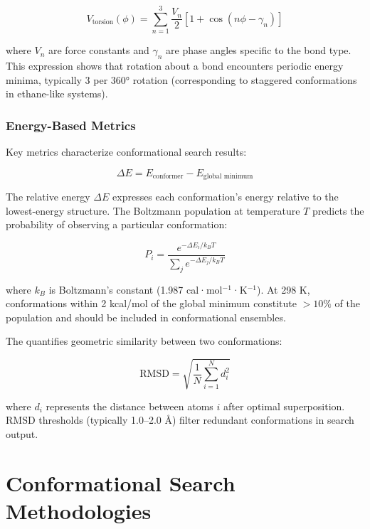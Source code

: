 \documentclass[12pt]{article}
\begin{document}
\begin{equation}
V_{\text{torsion}}(\phi) = \sum_{n=1}^{3} \frac{V_n}{2} \left[1 + \cos(n\phi - \gamma_n)\right]
\label{eq:torsion_potential}
\end{equation}

where $V_n$ are force constants and $\gamma_n$ are phase angles specific to the bond type. This expression shows that rotation about a bond encounters periodic energy minima, typically 3 per 360° rotation (corresponding to staggered conformations in ethane-like systems).

\subsubsection{Energy-Based Metrics}

Key metrics characterize conformational search results:

\begin{equation}
\Delta E = E_{\text{conformer}} - E_{\text{global minimum}}
\label{eq:relative_energy}
\end{equation}

The relative energy $\Delta E$ expresses each conformation's energy relative to the lowest-energy structure. The Boltzmann population at temperature $T$ predicts the probability of observing a particular conformation:

\begin{equation}
P_i = \frac{e^{-\Delta E_i / k_B T}}{\sum_j e^{-\Delta E_j / k_B T}}
\label{eq:boltzmann}
\end{equation}

where $k_B$ is Boltzmann's constant (1.987 cal·mol$^{-1}$·K$^{-1}$). At 298 K, conformations within 2 kcal/mol of the global minimum constitute $>10\%$ of the population and should be included in conformational ensembles.

The \RMSD quantifies geometric similarity between two conformations:

\begin{equation}
\text{RMSD} = \sqrt{\frac{1}{N} \sum_{i=1}^{N} d_i^2}
\label{eq:rmsd}
\end{equation}

where $d_i$ represents the distance between atoms $i$ after optimal superposition. RMSD thresholds (typically 1.0--2.0 Å) filter redundant conformations in search output.

\section{Conformational Search Methodologies}
\end{document}
